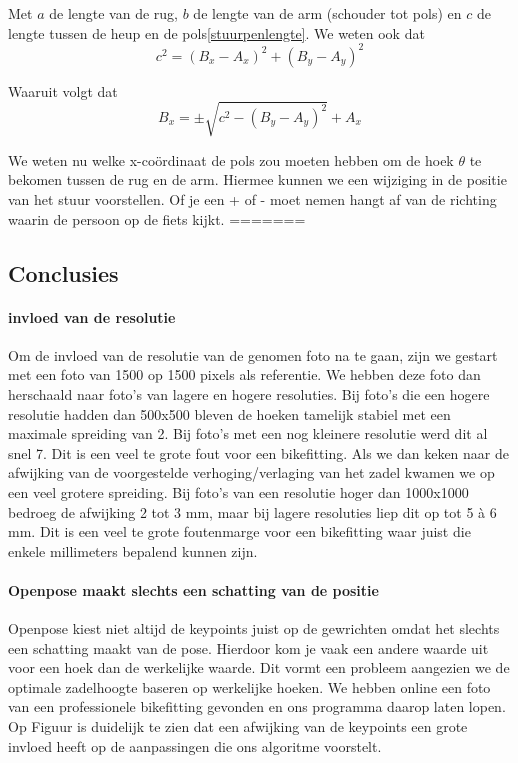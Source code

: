 \documentclass[a4paper,twoside,kulak]{kulakreport}
\begin{document}
Met \(a\) de lengte van de rug, \(b\) de lengte van de arm (schouder tot pols) en \(c\) de lengte tussen de heup en de pols\ref{stuurpenlengte}. We weten ook dat
\[c^2 = (B_x - A_x)^2 + (B_y - A_y)^2\]

Waaruit volgt dat
\[B_x = \pm \sqrt{c^2 -(B_y - A_y)^2 } + A_x\]

We weten nu welke x-coördinaat de pols zou moeten hebben om de hoek $\theta$ te bekomen tussen de rug en de arm. Hiermee kunnen we een wijziging in de positie van het stuur voorstellen. Of je een + of - moet nemen hangt af van de richting waarin de persoon op de fiets kijkt.
=======
\subsection{Conclusies}

\paragraph{invloed van de resolutie}
Om de invloed van de resolutie van de genomen foto na te gaan, zijn we gestart met een foto van 1500 op 1500 pixels als referentie. We hebben deze foto dan herschaald naar foto's van lagere en hogere resoluties. Bij foto's die een hogere resolutie hadden dan 500x500 bleven de hoeken tamelijk stabiel met een maximale spreiding van 2\degree. Bij foto's met een nog kleinere resolutie werd dit al snel 7\degree. Dit is een veel te grote fout voor een bikefitting. Als we dan keken naar de afwijking van de voorgestelde verhoging/verlaging van het zadel kwamen we op een veel grotere spreiding. Bij foto's van een resolutie hoger dan 1000x1000 bedroeg de afwijking 2 tot 3 \si{mm}, maar bij lagere resoluties liep dit op tot 5 à 6 \si{mm}. Dit is een veel te grote foutenmarge voor een bikefitting waar juist die enkele millimeters bepalend kunnen zijn.

\paragraph{Openpose maakt slechts een schatting van de positie}
Openpose kiest niet altijd de keypoints juist op de gewrichten omdat het slechts een schatting maakt van de pose. Hierdoor kom je vaak een andere waarde uit voor een hoek dan de werkelijke waarde. Dit vormt een probleem aangezien we de optimale zadelhoogte baseren op werkelijke hoeken. We hebben online een foto van een professionele bikefitting gevonden en ons programma daarop laten lopen. Op Figuur %
is duidelijk te zien dat een afwijking van de keypoints een grote invloed heeft op de aanpassingen die ons algoritme voorstelt.
\end{document}
